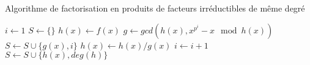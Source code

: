 \begin{algorithm}
  \caption{Algorithme de factorisation en produits de facteurs
        irr\'eductibles de même degr\'e }
  \label{alg:dff}
  \begin{algorithmic}[1]
    \Statex
      \State $i \gets 1$
      \State $S \gets \{\}$
      \State $h(x) \gets f(x)$
        \State $g \gets gcd(h(x), x^{p^i} - x \mod h(x))$
          \State $S \gets S \cup \{g(x), i\}$
        \EndIf
        \State $h(x) \gets h(x)/g(x)$
        \State $i \gets i+1$
      \EndWhile
        \State $S \gets S \cup \{h(x), deg(h)\}$
      \EndIf
      \State {}
    \EndFunction
  \end{algorithmic}
\end{algorithm}
